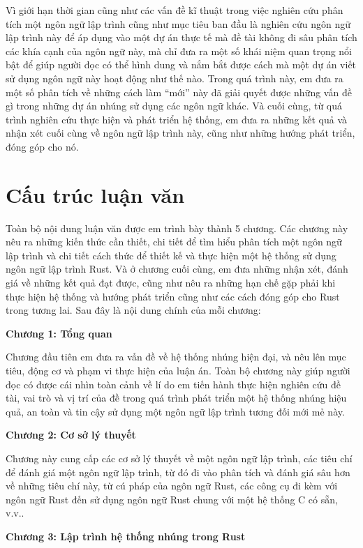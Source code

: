 Vì giới hạn thời gian cũng như các vấn đề kĩ thuật trong việc nghiên cứu phân tích một ngôn ngữ lập trình cũng như mục tiêu ban đầu là nghiên cứu ngôn ngữ lập trình này để áp dụng vào một dự án thực tế mà đề tài không đi sâu phân tích các khía cạnh của ngôn ngữ này, mà chỉ đưa ra một số khái niệm quan trọng nổi bật để giúp người đọc có thể hình dung và nắm bắt được cách mà một dự án viết sử dụng ngôn ngữ này hoạt động như thế nào.
Trong quá trình này, em đưa ra một số phân tích về những cách làm ``mới'' này đã giải quyết được những vấn đề gì trong những dự án nhúng sử dụng các ngôn ngữ khác.
Và cuối cùng, từ quá trình nghiên cứu thực hiện và phát triển hệ thống, em đưa ra những kết quả và nhận xét cuối cùng về ngôn ngữ lập trình này, cũng như những hướng phát triển, đóng góp cho nó.

\section{Cấu trúc luận văn}
Toàn bộ nội dung luận văn được em trình bày thành 5 chương. Các chương này nêu ra những kiến thức cần thiết, chi tiết để tìm hiểu phân tích một ngôn ngữ lập trình và chi tiết cách thức để thiết kế và thực hiện một hệ thống sử dụng ngôn ngữ lập trình Rust. Và ở chương cuối cùng, em đưa những nhận xét, đánh giá về những kết quả đạt được, cũng như nêu ra những hạn chế gặp phải khi thực hiện hệ thống và hướng phát triển cũng như các cách đóng góp cho Rust trong tương lai. Sau đây là nội dung chính của mỗi chương:

\textbf{Chương 1: Tổng quan}

Chương đầu tiên em đưa ra vấn đề về hệ thống nhúng hiện đại, và nêu lên mục tiêu, động cơ và phạm vi thực hiện của luận án. Toàn bộ chương này giúp người đọc có được cái nhìn toàn cảnh về lí do em tiến hành thực hiện nghiên cứu đề tài, vai trò và vị trí của đề trong quá trình phát triển một hệ thống nhúng hiệu quả, an toàn và tin cậy sử dụng một ngôn ngữ lập trình tương đối mới mẻ này.

\textbf{Chương 2: Cơ sở lý thuyết}

Chương này cung cấp các cơ sở lý thuyết về một ngôn ngữ lập trình, các tiêu chí để đánh giá một ngôn ngữ lập trình, từ đó đi vào phân tích và đánh giá sâu hơn về những tiêu chí này, từ cú pháp của ngôn ngữ Rust, các công cụ đi kèm với ngôn ngữ Rust đến sử dụng ngôn ngữ Rust chung với một hệ thống C có sẵn, v.v..

\textbf{Chương 3: Lập trình hệ thống nhúng trong Rust}

